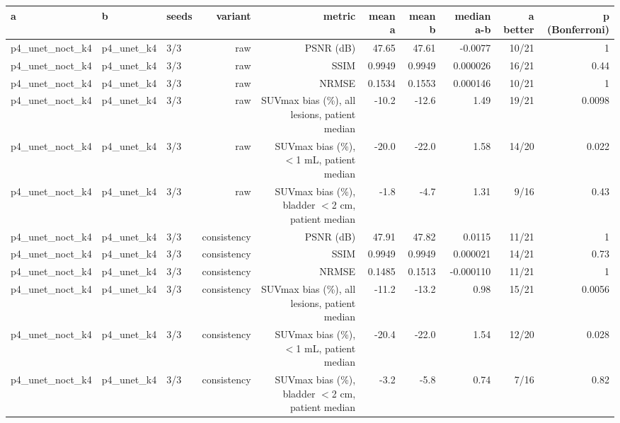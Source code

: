 \begin{tabular}{lllrrrrrrr}
\toprule
a & b & seeds & variant & metric & mean a & mean b & median a-b & a better & p (Bonferroni) \\
\midrule
p4\_unet\_noct\_k4 & p4\_unet\_k4 & 3/3 & raw & PSNR (dB) & 47.65 & 47.61 & -0.0077 & 10/21 & 1 \\
p4\_unet\_noct\_k4 & p4\_unet\_k4 & 3/3 & raw & SSIM & 0.9949 & 0.9949 & 0.000026 & 16/21 & 0.44 \\
p4\_unet\_noct\_k4 & p4\_unet\_k4 & 3/3 & raw & NRMSE & 0.1534 & 0.1553 & 0.000146 & 10/21 & 1 \\
p4\_unet\_noct\_k4 & p4\_unet\_k4 & 3/3 & raw & SUVmax bias (\%), all lesions, patient median & -10.2 & -12.6 & 1.49 & 19/21 & 0.0098 \\
p4\_unet\_noct\_k4 & p4\_unet\_k4 & 3/3 & raw & SUVmax bias (\%), $<$1 mL, patient median & -20.0 & -22.0 & 1.58 & 14/20 & 0.022 \\
p4\_unet\_noct\_k4 & p4\_unet\_k4 & 3/3 & raw & SUVmax bias (\%), bladder $<$2 cm, patient median & -1.8 & -4.7 & 1.31 & 9/16 & 0.43 \\
p4\_unet\_noct\_k4 & p4\_unet\_k4 & 3/3 & consistency & PSNR (dB) & 47.91 & 47.82 & 0.0115 & 11/21 & 1 \\
p4\_unet\_noct\_k4 & p4\_unet\_k4 & 3/3 & consistency & SSIM & 0.9949 & 0.9949 & 0.000021 & 14/21 & 0.73 \\
p4\_unet\_noct\_k4 & p4\_unet\_k4 & 3/3 & consistency & NRMSE & 0.1485 & 0.1513 & -0.000110 & 11/21 & 1 \\
p4\_unet\_noct\_k4 & p4\_unet\_k4 & 3/3 & consistency & SUVmax bias (\%), all lesions, patient median & -11.2 & -13.2 & 0.98 & 15/21 & 0.0056 \\
p4\_unet\_noct\_k4 & p4\_unet\_k4 & 3/3 & consistency & SUVmax bias (\%), $<$1 mL, patient median & -20.4 & -22.0 & 1.54 & 12/20 & 0.028 \\
p4\_unet\_noct\_k4 & p4\_unet\_k4 & 3/3 & consistency & SUVmax bias (\%), bladder $<$2 cm, patient median & -3.2 & -5.8 & 0.74 & 7/16 & 0.82 \\
\bottomrule
\end{tabular}
